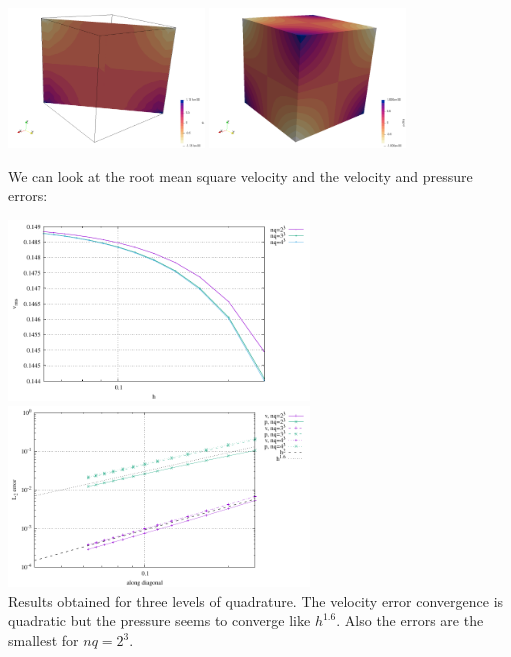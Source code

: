 \begin{center}
\includegraphics[width=5.2cm]{python_codes/fieldstone_82/RESULTS/bench5/press2}
\includegraphics[width=5.2cm]{python_codes/fieldstone_82/RESULTS/bench5/pressth}
\end{center}

We can look at the root mean square velocity and the velocity and pressure errors:

\begin{center}
\includegraphics[width=8cm]{python_codes/fieldstone_82/RESULTS/bench5/vrms.pdf}
\includegraphics[width=8cm]{python_codes/fieldstone_82/RESULTS/bench5/conv.pdf}\\
{\captionfont Results obtained for three levels of quadrature. The velocity error 
convergence is quadratic but the pressure seems to converge like $h^{1.6}$.
Also the errors are the smallest for $nq=2^3$.}
\end{center}

